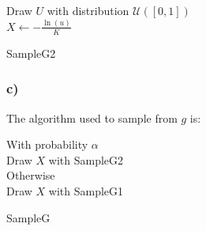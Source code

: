 \begin{algorithm}[H]
	Draw $U$ with distribution $\mathcal{U}([0,1])$\\
	$X \leftarrow -\frac{\ln(u)}{K}$\\ 
	\caption{SampleG2}
\end{algorithm}
\subsubsection*{c)}

The algorithm used to sample from $g$ is:

\begin{algorithm}[H]
	With probability $\alpha$\\
	Draw $X$ with SampleG2\\
	Otherwise\\
	Draw $X$ with SampleG1\\
	\caption{SampleG}
\end{algorithm}


